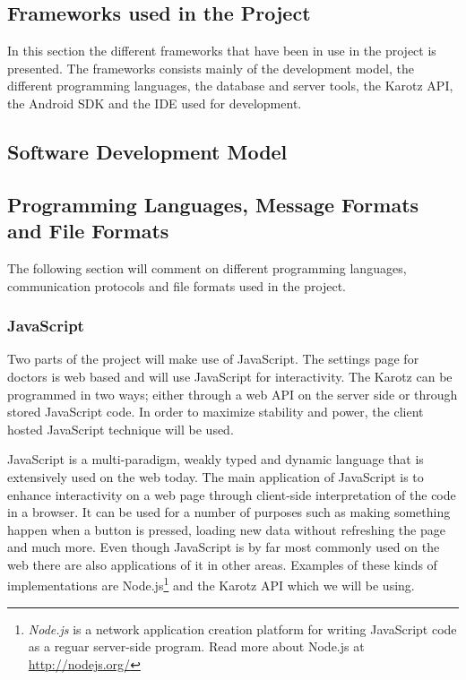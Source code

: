 \subsection{Frameworks used in the Project}
In this section the different frameworks that have been in use in the project is presented.
The frameworks consists mainly of the development model, the different programming languages, the database and server tools, the Karotz API, the Android SDK and the IDE used for development.

\subsection{Software Development Model}


\subsection{Programming Languages, Message Formats and File Formats}
The following section will comment on different programming languages, communication protocols and file formats used in the project.

\subsubsection{JavaScript}
Two parts of the project will make use of JavaScript. The settings page for doctors is web based and will use JavaScript for interactivity. The Karotz can be programmed in two ways; either through a web API on the server side or through stored JavaScript code. In order to maximize stability and power, the client hosted JavaScript technique will be used.

JavaScript is a multi-paradigm, weakly typed and dynamic language that is extensively used on the web today. The main application of JavaScript is to enhance interactivity on a web page through client-side interpretation of the code in a browser. It can be used for a number of purposes such as making something happen when a button is pressed, loading new data without refreshing the page and much more. Even though JavaScript is by far most commonly used on the web there are also applications of it in other areas. Examples of these kinds of implementations are Node.js\footnote{\emph{Node.js} is a network application creation platform for writing JavaScript code as a reguar server-side program. Read more about Node.js at \href{http://nodejs.org/}{http://nodejs.org/}} and the Karotz API which we will be using.

